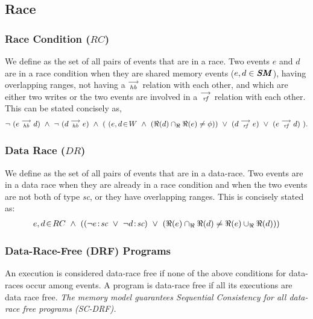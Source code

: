         
    \subsection{Race}
        \subsubsection{Race Condition ($RC$)}
            We define  as the set of all pairs of events that are in a race. Two events $e$ and $d$ are in a race condition when they are shared memory events ($e,d \in \textbf{\textit{SM}}$), having overlapping ranges, not having a $\stackrel{\longrightarrow}{_\textit{hb}}$ relation with each other, and which are either two writes or the two events are involved in a $\stackrel{\longrightarrow}{_\textit{rf}}$ relation with each other. This can be stated concisely as,
                \begin{align*}
                    \neg \ (\reln{e}{hb}{d})\ \wedge\ \neg \ (\reln{d}{hb}{e}) 
                    \ \wedge \ 
                     ( \
                     (\event{e,d}{W}\  \wedge\ (\Re(d) \cap_{\Re} \Re(e) \neq \phi)) 
                          \  \vee\ (d \stck{_\textit{rf}} e)\ \vee\ (e \stck{_\textit{rf}} d)
                    \ ).
                \end{align*}
                
        \subsubsection{Data Race ($DR$)}
            We define  as the set of all pairs of events that are in a data-race. Two events are in a data race when they are already in a race condition and when the two events are not both of type \textit{sc}, or they have overlapping ranges. This is concisely stated as:  
                \begin{align*}
                    \event{e,d}{RC}  \ \wedge \ 
                    ((\neg\et{e}{sc} \ \vee \ \neg\et{d}{sc}) \ \vee \ 
                    (\Re(e) \cap_{\Re} \Re(d) \neq \Re(e) \cup_{\Re} \Re(d))) 
                \end{align*}

        \subsubsection{Data-Race-Free (DRF) Programs}
            An execution is considered data-race free if none of the above conditions for data-races occur among events. A program is data-race free if all its executions are data race free.          
            \textit{The memory model guarantees Sequential Consistency for all data-race free programs (SC-DRF).}
            